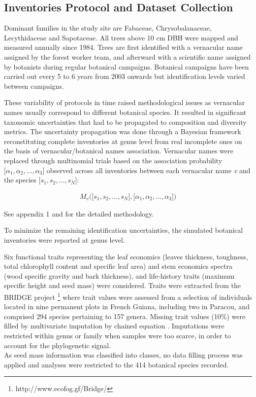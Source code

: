 \documentclass[fleqn,10pt]{ArtEcoFoG} %
\begin{document}
\subsection{Inventories Protocol and Dataset
Collection}\label{inventories-protocol-and-dataset-collection}

Dominant families in the study site are Fabaceae, Chrysobalanaceae,
Lecythidaceae and Sapotaceae. All trees above 10 cm DBH were mapped and
measured annually since 1984. Trees are first identified with a
vernacular name assigned by the forest worker team, and afterward with a
scientific name assigned by botanists during regular botanical
campaigns. Botanical campaigns have been carried out every 5 to 6 years
from 2003 onwards but identification levels varied between campaigns.

These variability of protocols in time raised methodological issues as
vernacular names usually correspond to different botanical species. It
resulted in significant taxonomic uncertainties that had to be
propagated to composition and diversity metrics. The uncertainty
propagation was done through a Bayesian framework reconstituting
complete inventories at genus level from real incomplete ones on the
basis of vernacular/botanical names association. Vernacular names were
replaced through multinomial trials based on the association probability
\(\big[\alpha_1, \alpha_2,..., \alpha_3\big]\) observed across all
inventories between each vernacular name \emph{v} and the species
\(\big[s_1, s_2,..., s_N\big]\):

\begin{align}
M_v\Big(\big[s_1, s_2,..., s_N\big],\big[\alpha_1, \alpha_2,..., \alpha_3\big]\Big) \nonumber
\end{align}

See appendix 1 and \citet{Aubry-Kientz2013} for the detailed
methodology.

To minimize the remaining identification uncertainties, the simulated
botanical inventories were reported at genus level.

Six functional traits representing the leaf economics (leaves thickness,
toughness, total chlorophyll content and specific leaf area) and stem
economics spectra (wood specific gravity and bark thickness), and
life-history traits (maximum specific height and seed mass) were
considered. Traits were extracted from the BRIDGE project \footnote{http://www.ecofog.gf/Bridge/}
where trait values were assessed from a selection of individuals located
in nine permanent plots in French Guiana, including two in Paracou, and
comprised 294 species pertaining to 157 genera. Missing trait values
(10\%) were filled by multivariate imputation by chained equation
\citep{Mice2011}. Imputations were restricted within genus or family
when samples were too scarce, in order to account for the phylogenetic
signal.\\
As seed mass information was classified into classes, no data filling
process was applied and analyses were restricted to the 414 botanical
species recorded.
\end{document}
